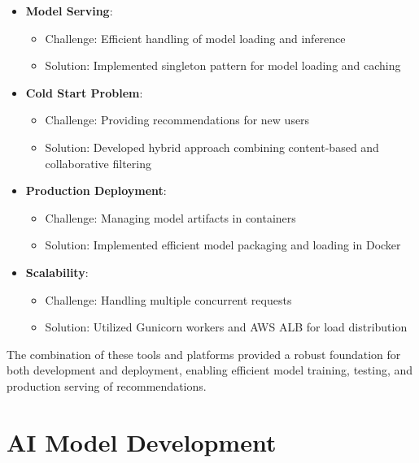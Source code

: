 \documentclass[12pt]{article}
\begin{document}
\begin{itemize}
    \item \textbf{Model Serving}:
    \begin{itemize}
        \item Challenge: Efficient handling of model loading and inference
        \item Solution: Implemented singleton pattern for model loading and caching
    \end{itemize}
    
    \item \textbf{Cold Start Problem}:
    \begin{itemize}
        \item Challenge: Providing recommendations for new users
        \item Solution: Developed hybrid approach combining content-based and collaborative filtering
    \end{itemize}
    
    \item \textbf{Production Deployment}:
    \begin{itemize}
        \item Challenge: Managing model artifacts in containers
        \item Solution: Implemented efficient model packaging and loading in Docker
    \end{itemize}
    
    \item \textbf{Scalability}:
    \begin{itemize}
        \item Challenge: Handling multiple concurrent requests
        \item Solution: Utilized Gunicorn workers and AWS ALB for load distribution
    \end{itemize}
\end{itemize}

The combination of these tools and platforms provided a robust foundation for both development and deployment, enabling efficient model training, testing, and production serving of recommendations.


\section{AI Model Development}
\end{document}
